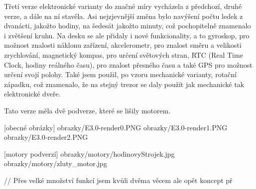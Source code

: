 Třetí verze elektronické varianty do značné míry vycházela z předchozí, druhé verze, a dále na ní stavěla. Asi nejzjevnější změna bylo navýšení počtu 
ledek z dvanácti, jakožto hodiny, na šedesát jakožto minuty, což pochopitelně znamenalo i zvětšení kruhu. Na desku se ale přidaly i nové funkcionality,
a to gyroskop, pro možnost znalosti náklonu zařízení, akcelerometr, pro znalost směru a velikosti zrychlování, magnetický kompas, pro určení světových
stran, RTC (Real Time Clock, hodiny reálného času), pro znalost přesného času a také GPS pro možnost určení svojí polohy.
Také jsem použil, po vzoru mechanické varianty, rotační západku, což znamenalo, že na stejný trezor se daly použít jak mechanické tak 
elektronické dveře.

Tato verze měla dvě podverze, které se lišily motorem.

[obecné obrázky]
obrazky/E3.0-render0.PNG                obrazky/E3.0-render1.PNG            obrazky/E3.0-render2.PNG

[motory podverzí]
obrazky/motory/hodinovyStrojek.jpg      obrazky/motory/zluty_motor.jpg


// Přes velké množství funkcí jsem kvůli dvěma věcem ale opět koncept př
